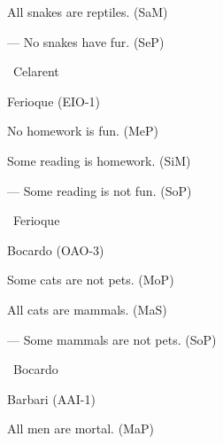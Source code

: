 \begin{isabellebody}
\begin{exercise}[subtitle=Silogizmi]
%
\begin{isamarkuptext}%
All snakes are reptiles. (SaM)%
\end{isamarkuptext}\isamarkuptrue%
%
\begin{isamarkuptext}%
— No snakes have fur. (SeP)%
\end{isamarkuptext}\isamarkuptrue%
\isamarkupfalse%
\ Celarent{\isacharcolon}{\kern0pt}\ %
\isadelimproof
%
\endisadelimproof
%
\isatagproof
%
\endisatagproof
{\isafoldproof}%
%
\isadelimproof
%
\endisadelimproof
%
\begin{isamarkuptext}%
Ferioque (EIO-1)%
\end{isamarkuptext}\isamarkuptrue%
%
\begin{isamarkuptext}%
No homework is fun. (MeP)%
\end{isamarkuptext}\isamarkuptrue%
%
\begin{isamarkuptext}%
Some reading is homework. (SiM)%
\end{isamarkuptext}\isamarkuptrue%
%
\begin{isamarkuptext}%
— Some reading is not fun. (SoP)%
\end{isamarkuptext}\isamarkuptrue%
\isamarkupfalse%
\ Ferioque{\isacharcolon}{\kern0pt}\ %
\isadelimproof
%
\endisadelimproof
%
\isatagproof
%
\endisatagproof
{\isafoldproof}%
%
\isadelimproof
%
\endisadelimproof
%
\begin{isamarkuptext}%
Bocardo (OAO-3)%
\end{isamarkuptext}\isamarkuptrue%
%
\begin{isamarkuptext}%
Some cats are not pets. (MoP)%
\end{isamarkuptext}\isamarkuptrue%
%
\begin{isamarkuptext}%
All cats are mammals. (MaS)%
\end{isamarkuptext}\isamarkuptrue%
%
\begin{isamarkuptext}%
— Some mammals are not pets. (SoP)%
\end{isamarkuptext}\isamarkuptrue%
\isamarkupfalse%
\ Bocardo{\isacharcolon}{\kern0pt}%
\isadelimproof
%
\endisadelimproof
%
\isatagproof
%
\endisatagproof
{\isafoldproof}%
%
\isadelimproof
%
\endisadelimproof
%
\begin{isamarkuptext}%
Barbari (AAI-1)%
\end{isamarkuptext}\isamarkuptrue%
%
\begin{isamarkuptext}%
All men are mortal. (MaP)%
\end{isamarkuptext}\isamarkuptrue%
%
\begin{isamarkuptext}%

\end{isamarkuptext}
\end{exercise}
\end{isabellebody}
